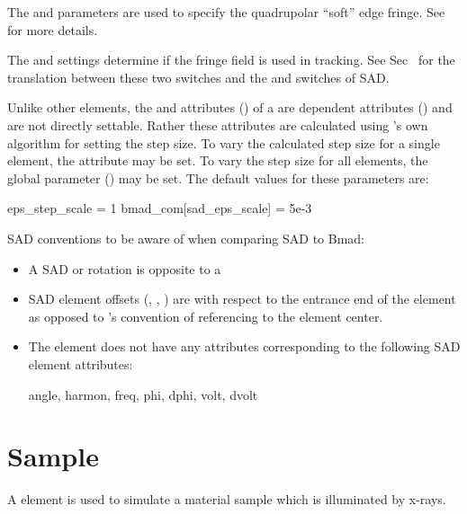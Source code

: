 {The  and  parameters are used to specify the
quadrupolar ``soft'' edge fringe. See  for more details.

The  and  settings determine if the fringe field is used in
tracking. See Sec~ for the translation between these two switches and the
 and  switches of SAD.

Unlike other elements, the  and  attributes () of a 
are dependent attributes () and are not directly settable. Rather these
attributes are calculated using 's own algorithm for setting the step size. To
vary the calculated step size for a single  element, the attribute
 may be set.  To vary the step size for all  elements, the
global parameter  () may be set.
The default values for these parameters are:
\begin{example}
  eps_step_scale          = 1
  bmad_com[sad_eps_scale] = 5e-3
\end{example}

SAD conventions to be aware of when comparing SAD to Bmad:
\begin{itemize}
\item
A SAD  or  rotation is opposite to a \bmad {}
\item
SAD element offsets (, , ) are with respect to the entrance end
of the element as opposed to \bmad's convention of referencing to the element center.
\item
  The \bmad {} element does not have any attributes corresponding to the following
SAD  element attributes:
\begin{example}
  angle, harmon, freq, phi, dphi, volt, dvolt
\end{example}
\end{itemize}

\section{Sample}
\label{s:sample}

A  element is used to simulate a material sample which is illuminated by x-rays.

}
